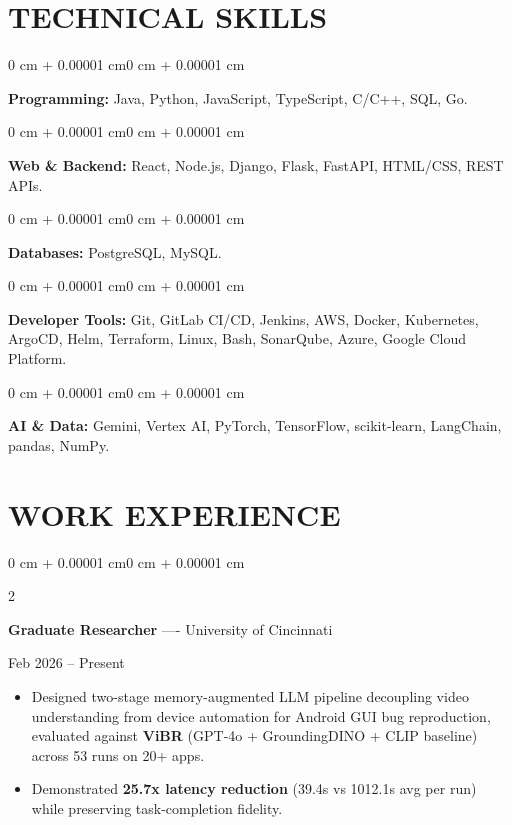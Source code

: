 \documentclass[10pt, letterpaper]{article}
\newenvironment{highlights}{
    \begin{itemize}[
        topsep=0.10 cm,
        parsep=0.06 cm,
        partopsep=0pt,
        itemsep=0.06 cm,
        leftmargin=12pt
    ]
}{
    \end{itemize}
}
\newenvironment{onecolentry}{
    \begin{adjustwidth}{0 cm + 0.00001 cm}{0 cm + 0.00001 cm}
}{
    \end{adjustwidth}
}
\newenvironment{twocolentry}[2][]{
    \onecolentry
    \def\secondColumn{#2}
    \setcolumnwidth{\fill, 4.5 cm}
    \begin{paracol}{2}
}{
    \switchcolumn \raggedleft \secondColumn
    \end{paracol}
    \endonecolentry
}
\begin{document}
\section{TECHNICAL SKILLS}
\begin{onecolentry}
\textbf{Programming:} Java, Python, JavaScript, TypeScript, C/C++, SQL, Go.
\end{onecolentry}
\vspace{0.06 cm}
\begin{onecolentry}
\textbf{Web \& Backend:} React, Node.js, Django, Flask, FastAPI, HTML/CSS, REST APIs.
\end{onecolentry}
\vspace{0.06 cm}
\begin{onecolentry}
\textbf{Databases:} PostgreSQL, MySQL.
\end{onecolentry}
\vspace{0.06 cm}
\begin{onecolentry}
\textbf{Developer Tools:} Git, GitLab CI/CD, Jenkins, AWS, Docker, Kubernetes, ArgoCD, Helm, Terraform, Linux, Bash, SonarQube, Azure, Google Cloud Platform.
\end{onecolentry}
\vspace{0.06 cm}
\begin{onecolentry}
\textbf{AI \& Data:} Gemini, Vertex AI, PyTorch, TensorFlow, scikit-learn, LangChain, pandas, NumPy.
\end{onecolentry}

\section{WORK EXPERIENCE}
\begin{twocolentry}{Feb 2026 -- Present}
\textbf{Graduate Researcher} ---- University of Cincinnati
\end{twocolentry}
\begin{highlights}
  \item Designed two-stage memory-augmented LLM pipeline decoupling video understanding from device automation for Android GUI bug reproduction, evaluated against \textbf{ViBR} (GPT-4o + GroundingDINO + CLIP baseline) across 53 runs on 20+ apps.
  \item Demonstrated \textbf{25.7x latency reduction} (39.4s vs 1012.1s avg per run) while preserving task-completion fidelity.
\end{highlights}
\end{document}
